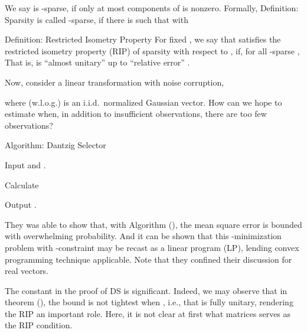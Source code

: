 We say  is -sparse, if only at most  components of  is nonzero.
Formally,
\Result
{Definition: Sparsity}
{
 is called -sparse, if there is  such that
with
}

\Result
{Definition: Restricted Isometry Property}
{
For fixed , we say that \m {\M {\Phi}} satisfies the restricted isometry property (RIP) of sparsity  with respect to , if, for all -sparse ,
}
That is, \m {\Phi} is ``almost unitary'' up to ``relative error'' .

Now, consider a linear transformation with noise corruption,


where (w.l.o.g.)  is an i.i.d.\ normalized Gaussian vector.
How can we hope to estimate  when, in addition to insufficient observations, there are too few observations?

\Result
{Algorithm: Dantzig Selector}
{
\startitemize[n]
\item Input  and .
\item Calculate
\item Output .
}

They was able to show that, with Algorithm (), the mean square error is bounded with overwhelming probability.
And it can be shown that this -minimization problem with \m {\ell_\infty}-constraint may be recast as a linear program (LP), lending convex programming technique applicable.
Note that they confined their discussion for real vectors.

The constant \m {\d} in the proof of DS is significant.
Indeed, we may observe that in theorem (), the bound is not tightest when , i.e., that \m {\Phi} is fully unitary, rendering the RIP an important role.
Here, it is not clear at first what matrices serves as the RIP condition.

